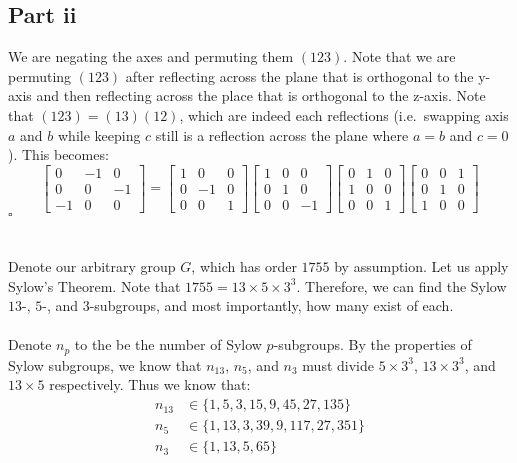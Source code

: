 \documentclass[letterpaper]{article}
\newcommand*{\QED}{\hfill\ensuremath{\square}}%
\begin{document}
\subsection{Part ii}
\label{subs:6Partii}

We are negating the axes and permuting them $ (123) $.
Note that we are permuting $ (123) $ after reflecting across the plane that is orthogonal to the y-axis and then reflecting across the place that is orthogonal to the z-axis.
Note that $ (123) = (13)(12) $, which are indeed each reflections (i.e.\ swapping axis $ a $ and $ b $ while keeping $ c $ still is a reflection across the plane where $ a = b $ and $ c = 0 $).
This becomes:
\[
\begin{bmatrix}
0 & -1 & 0 \\
0 & 0 & -1 \\
-1 & 0 & 0
\end{bmatrix}
=
\begin{bmatrix}
1 & 0 & 0 \\
0 & -1 & 0 \\
0 & 0 & 1
\end{bmatrix}
\begin{bmatrix}
1 & 0 & 0 \\
0 & 1 & 0 \\
0 & 0 & -1
\end{bmatrix}
\begin{bmatrix}
0 & 1 & 0 \\
1 & 0 & 0 \\
0 & 0 & 1
\end{bmatrix}
\begin{bmatrix}
0 & 0 & 1 \\
0 & 1 & 0 \\
1 & 0 & 0
\end{bmatrix}
\]
\QED{}

\section{}
\label{sec:Question7}

Denote our arbitrary group $ G $, which has order $ 1755 $ by assumption.
Let us apply Sylow's Theorem.
Note that $ 1755 = 13 \times 5 \times 3^3 $.
Therefore, we can find the Sylow $ 13 $-, $ 5 $-, and $ 3 $-subgroups, and most importantly, how many exist of each.
\\ \\
Denote $ n_p $ to the be the number of Sylow $ p $-subgroups.
By the properties of Sylow subgroups, we know that $ n_{13} $, $ n_5 $, and $ n_3 $ must divide $ 5 \times 3^3 $, $ 13 \times 3^3 $, and $ 13 \times 5 $ respectively.
Thus we know that:
\begin{align}
    n_{13} &\in \{1, 5, 3, 15, 9, 45, 27, 135 \} \\
    n_{5} &\in \{1, 13, 3, 39, 9, 117, 27, 351 \} \\
    n_{3} &\in \{1, 13, 5, 65 \}
\end{align}
\end{document}
